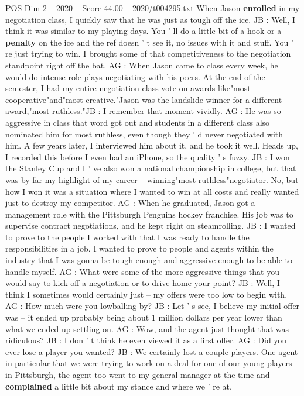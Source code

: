 \begin{textsample}{POS Dim 2 – 2020 – Score 44.00 – 2020/t004295.txt}
When Jason \textbf{enrolled} in my negotiation class, I quickly saw that he was just as tough off the ice.
JB : Well, I think it was similar to my playing days.
You ' ll do a little bit of a hook or a \textbf{penalty} on the ice and the ref doesn ' t see it, no issues with it and stuff.
You ' re just trying to win.
I brought some of that competitiveness to the negotiation standpoint right off the bat.
AG : When Jason came to class every week, he would do intense role plays negotiating with his peers.
At the end of the semester, I had my entire negotiation class vote on awards like"most cooperative"and"most creative."Jason was the landslide winner for a different award,"most ruthless."JB : I remember that moment vividly.
AG : He was so aggressive in class that word got out and students in a different class also nominated him for most ruthless, even though they ' d never negotiated with him.
A few years later, I interviewed him about it, and he took it well.
Heads up, I recorded this before I even had an iPhone, so the quality ' s fuzzy.
JB : I won the Stanley Cup and I ' ve also won a national championship in college, but that was by far my highlight of my career -- winning"most ruthless"negotiator.
No, but how I won it was a situation where I wanted to win at all costs and really wanted just to destroy my competitor.
AG : When he graduated, Jason got a management role with the Pittsburgh Penguins hockey franchise.
His job was to supervise contract negotiations, and he kept right on steamrolling.
JB : I wanted to prove to the people I worked with that I was ready to handle the responsibilities in a job.
I wanted to prove to people and agents within the industry that I was gonna be tough enough and aggressive enough to be able to handle myself.
AG : What were some of the more aggressive things that you would say to kick off a negotiation or to drive home your point?
JB : Well, I think I sometimes would certainly just -- my offers were too low to begin with.
AG : How much were you lowballing by?
JB : Let ' s see, I believe my initial offer was -- it ended up probably being about 1 million dollars per year lower than what we ended up settling on.
AG : Wow, and the agent just thought that was ridiculous?
JB : I don ' t think he even viewed it as a first offer.
AG : Did you ever lose a player you wanted?
JB : We certainly lost a couple players.
One agent in particular that we were trying to work on a deal for one of our young players in Pittsburgh, the agent too went to my general manager at the time and \textbf{complained} a little bit about my stance and where we ' re at.

\end{textsample}
